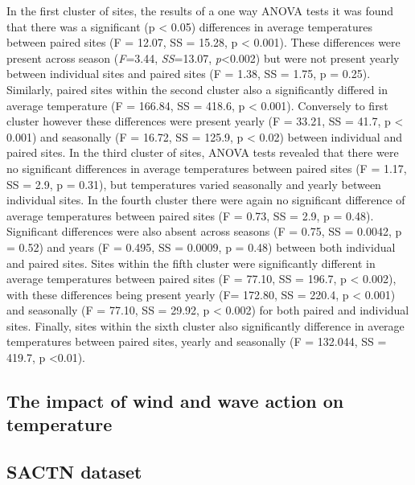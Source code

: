 \documentclass[12pt,a4paper,]{article}
\begin{document}
In the first cluster of sites, the results of a one way ANOVA tests it
was found that there was a significant (p \textless{} 0.05) differences
in average temperatures between paired sites (F = 12.07, SS = 15.28, p
\textless{} 0.001). These differences were present across season
(\emph{F}=3.44, \emph{SS}=13.07, \emph{p}\textless{}0.002) but were not
present yearly between individual sites and paired sites (F = 1.38, SS =
1.75, p = 0.25). Similarly, paired sites within the second cluster also
a significantly differed in average temperature (F = 166.84, SS = 418.6,
p \textless{} 0.001). Conversely to first cluster however these
differences were present yearly (F = 33.21, SS = 41.7, p \textless{}
0.001) and seasonally (F = 16.72, SS = 125.9, p \textless{} 0.02)
between individual and paired sites. In the third cluster of sites,
ANOVA tests revealed that there were no significant differences in
average temperatures between paired sites (F = 1.17, SS = 2.9, p =
0.31), but temperatures varied seasonally and yearly between individual
sites. In the fourth cluster there were again no significant difference
of average temperatures between paired sites (F = 0.73, SS = 2.9, p =
0.48). Significant differences were also absent across seasons (F =
0.75, SS = 0.0042, p = 0.52) and years (F = 0.495, SS = 0.0009, p =
0.48) between both individual and paired sites. Sites within the fifth
cluster were significantly different in average temperatures between
paired sites (F = 77.10, SS = 196.7, p \textless{} 0.002), with these
differences being present yearly (F= 172.80, SS = 220.4, p \textless{}
0.001) and seasonally (F = 77.10, SS = 29.92, p \textless{} 0.002) for
both paired and individual sites. Finally, sites within the sixth
cluster also significantly difference in average temperatures between
paired sites, yearly and seasonally (F = 132.044, SS = 419.7, p
\textless{}0.01).

\hypertarget{the-impact-of-wind-and-wave-action-on-temperature}{%
\subsection{The impact of wind and wave action on
temperature}\label{the-impact-of-wind-and-wave-action-on-temperature}}

\hypertarget{sactn-dataset}{%
\subsection{SACTN dataset}\label{sactn-dataset}}
\end{document}
